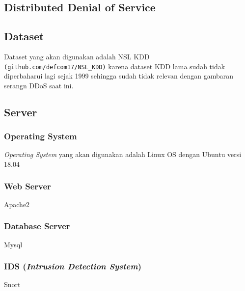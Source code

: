 \subsection{Distributed Denial of Service}


\subsection{Dataset}

Dataset yang akan digunakan adalah NSL KDD \texttt{(github.com/defcom17/NSL\_KDD)} karena dataset KDD lama sudah tidak diperbaharui lagi sejak 1999 sehingga sudah tidak relevan dengan gambaran serangn DDoS saat ini.

\subsection{Server}
\subsubsection{Operating System}

\textit{Operating System} yang akan digunakan adalah Linux OS dengan Ubuntu versi 18.04

\subsubsection{Web Server}
Apache2
\subsubsection{Database Server}
Mysql

\subsubsection{IDS (\textit{Intrusion Detection System})}
Snort

